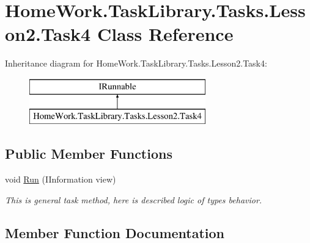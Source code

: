 \hypertarget{class_home_work_1_1_task_library_1_1_tasks_1_1_lesson2_1_1_task4}{}\section{Home\+Work.\+Task\+Library.\+Tasks.\+Lesson2.\+Task4 Class Reference}
\label{class_home_work_1_1_task_library_1_1_tasks_1_1_lesson2_1_1_task4}
Inheritance diagram for Home\+Work.\+Task\+Library.\+Tasks.\+Lesson2.\+Task4\+:\begin{figure}[H]
\begin{center}
\leavevmode
\includegraphics[height=2.000000cm]{class_home_work_1_1_task_library_1_1_tasks_1_1_lesson2_1_1_task4}
\end{center}
\end{figure}
\subsection*{Public Member Functions}
\begin{DoxyCompactItemize}
\item 
void \mbox{\hyperlink{class_home_work_1_1_task_library_1_1_tasks_1_1_lesson2_1_1_task4_a843e8a0a4310064f1d74db11a014cb45}{Run}} (I\+Information view)
\begin{DoxyCompactList}\small\item\em This is general task method, here is described logic of types behavior. \end{DoxyCompactList}\end{DoxyCompactItemize}


\subsection{Member Function Documentation}
\mbox{\label{class_home_work_1_1_task_library_1_1_tasks_1_1_lesson2_1_1_task4_a843e8a0a4310064f1d74db11a014cb45}} 
